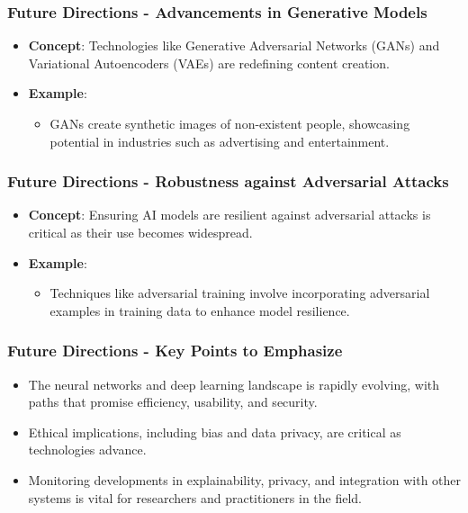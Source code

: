 \documentclass{beamer}
\begin{document}
\begin{frame}[fragile]
    \frametitle{Future Directions - Advancements in Generative Models}
    \begin{itemize}
        \item \textbf{Concept}: Technologies like Generative Adversarial Networks (GANs) and Variational Autoencoders (VAEs) are redefining content creation.
        \item \textbf{Example}:
        \begin{itemize}
            \item GANs create synthetic images of non-existent people, showcasing potential in industries such as advertising and entertainment.
        \end{itemize}
    \end{itemize}
\end{frame}

\begin{frame}[fragile]
    \frametitle{Future Directions - Robustness against Adversarial Attacks}
    \begin{itemize}
        \item \textbf{Concept}: Ensuring AI models are resilient against adversarial attacks is critical as their use becomes widespread.
        \item \textbf{Example}:
        \begin{itemize}
            \item Techniques like adversarial training involve incorporating adversarial examples in training data to enhance model resilience.
        \end{itemize}
    \end{itemize}
\end{frame}

\begin{frame}[fragile]
    \frametitle{Future Directions - Key Points to Emphasize}
    \begin{itemize}
        \item The neural networks and deep learning landscape is rapidly evolving, with paths that promise efficiency, usability, and security.
        \item Ethical implications, including bias and data privacy, are critical as technologies advance.
        \item Monitoring developments in explainability, privacy, and integration with other systems is vital for researchers and practitioners in the field.
    \end{itemize}
\end{frame}
\end{document}

